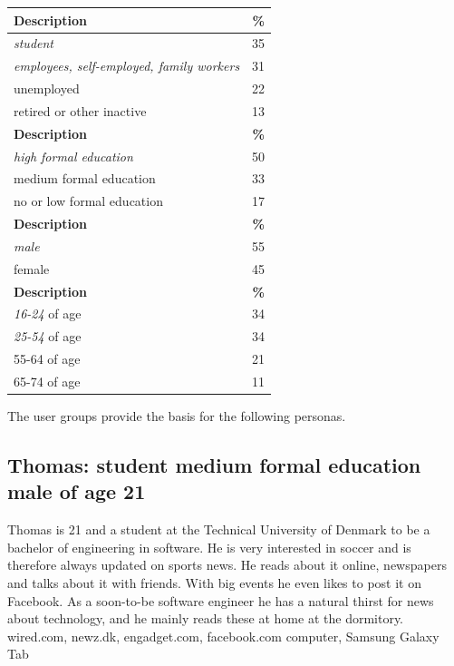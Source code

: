 \begin{table}[h!tp]
\myfloatalign
	\begin{tabularx}{\textwidth}{p{}|c}
		\toprule
		\textbf{Description} & \textbf{\%}\\
		\midrule
		\emph{student} & 35\\
		\midrule
		\emph{employees, self-employed, family workers} & 31\\
		\midrule
		unemployed & 22\\
		\midrule
		retired or other inactive & 13\\
		\bottomrule

		\textbf{Description} & \textbf{\%}\\
		\midrule
		\emph{high formal education} & 50\\
		\midrule
		medium formal education & 33\\
		\midrule
		no or low formal education & 17\\
		\bottomrule

		\textbf{Description} & \textbf{\%}\\
		\midrule
		\emph{male} & 55\\
		\midrule
		female & 45\\
		\bottomrule

		\textbf{Description} & \textbf{\%}\\
		\midrule
		\emph{16-24} of age & 34\\
		\midrule
		\emph{25-54} of age & 34\\
		\midrule
		55-64 of age & 21\\
		\midrule
		65-74 of age & 11\\
		\midrule
	\end{tabularx}
\end{table}

The user groups provide the basis for the following personas.

\subsection{Thomas: student medium formal education male of age 21}
Thomas is 21 and a student at the Technical University of Denmark to be a bachelor of engineering in software. He is very interested in soccer and is therefore always updated on sports news. He reads about it online, newspapers and talks about it with friends. With big events he even likes to post it on Facebook. As a soon-to-be software engineer he has a natural thirst for news about technology, and he mainly reads these at home at the dormitory.
wired.com, newz.dk, engadget.com, facebook.com
computer, Samsung Galaxy Tab

